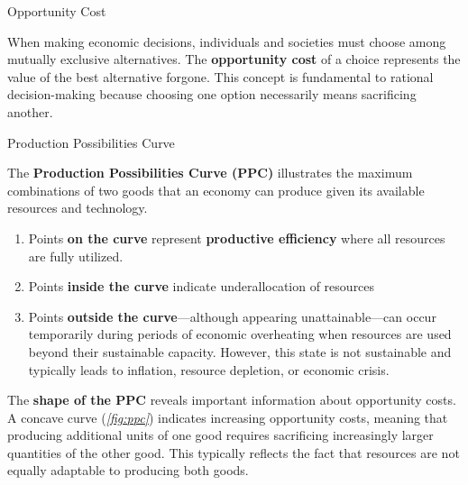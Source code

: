 \documentclass[10pt]{article}
\begin{document}
  \begin{core}{Opportunity Cost}

    When making economic decisions, individuals and societies must choose among mutually exclusive alternatives. The \textbf{opportunity cost} of a choice represents the value of the best alternative forgone. This concept is fundamental to rational decision-making because choosing one option necessarily means sacrificing another.

  \end{core}

  \begin{core}[label=core:ppc]{Production Possibilities Curve}

    The \textbf{Production Possibilities Curve (PPC)} illustrates the maximum combinations of two goods that an economy can produce given its available resources and technology. 

    \begin{enumerate}

      \item Points \textbf{on the curve} represent \textbf{productive efficiency} where all resources are fully utilized. 

      \item Points \textbf{inside the curve} indicate underallocation of resources

      \item Points \textbf{outside the curve}---although appearing unattainable---can occur temporarily during periods of economic overheating when resources are used beyond their sustainable capacity. However, this state is not sustainable and typically leads to inflation, resource depletion, or economic crisis.

    \end{enumerate}

    The \textbf{shape of the PPC} reveals important information about opportunity costs. A concave curve (\textit{\autoref{fig:ppc}}) indicates increasing opportunity costs, meaning that producing additional units of one good requires sacrificing increasingly larger quantities of the other good. This typically reflects the fact that resources are not equally adaptable to producing both goods.


\end{core}
\end{document}
